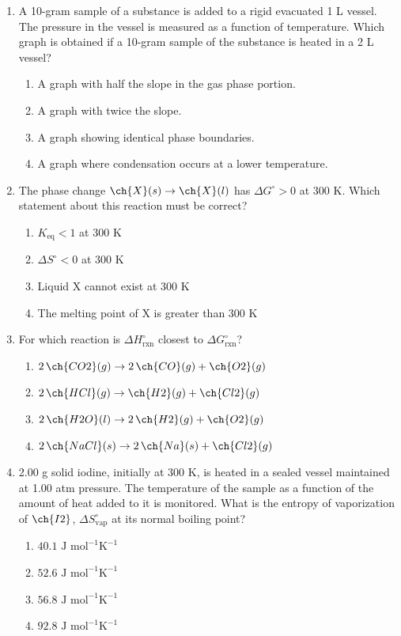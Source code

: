 \documentclass[twocolumn,10pt]{article}
\begin{document}
\begin{enumerate}[label=\arabic*., leftmargin=*]
\item A 10-gram sample of a substance is added to a rigid evacuated 1 L vessel. The pressure in the vessel is measured as a function of temperature. Which graph is obtained if a 10-gram sample of the substance is heated in a 2 L vessel?
\begin{enumerate}[label=(\Alph*)]
    \item A graph with half the slope in the gas phase portion.
    \item A graph with twice the slope.
    \item A graph showing identical phase boundaries.
    \item A graph where condensation occurs at a lower temperature.
\end{enumerate}

\item The phase change $\ch{X}(s) \rightarrow \ch{X}(l)$ has $\Delta G^\circ > 0$ at 300 K. Which statement about this reaction must be correct?
\begin{enumerate}[label=(\Alph*)]
    \item $K_{\text{eq}} < 1$ at 300 K
    \item $\Delta S^\circ < 0$ at 300 K
    \item Liquid X cannot exist at 300 K
    \item The melting point of X is greater than 300 K
\end{enumerate}

\item For which reaction is $\Delta H^\circ_{\text{rxn}}$ closest to $\Delta G^\circ_{\text{rxn}}$?
\begin{enumerate}[label=(\Alph*)]
    \item $2\,\ch{CO2}(g) \rightarrow 2\,\ch{CO}(g) + \ch{O2}(g)$
    \item $2\,\ch{HCl}(g) \rightarrow \ch{H2}(g) + \ch{Cl2}(g)$
    \item $2\,\ch{H2O}(l) \rightarrow 2\,\ch{H2}(g) + \ch{O2}(g)$
    \item $2\,\ch{NaCl}(s) \rightarrow 2\,\ch{Na}(s) + \ch{Cl2}(g)$
\end{enumerate}

\item 2.00 g solid iodine, initially at 300 K, is heated in a sealed vessel maintained at 1.00 atm pressure. The temperature of the sample as a function of the amount of heat added to it is monitored. What is the entropy of vaporization of $\ch{I2}$, $\Delta S^\circ_{\text{vap}}$ at its normal boiling point?
\begin{enumerate}[label=(\Alph*)]
    \item $40.1\text{ J mol}^{-1}\text{K}^{-1}$ \item $52.6\text{ J mol}^{-1}\text{K}^{-1}$ \item $56.8\text{ J mol}^{-1}\text{K}^{-1}$ \item $92.8\text{ J mol}^{-1}\text{K}^{-1}$
\end{enumerate}


\end{enumerate}
\end{document}
